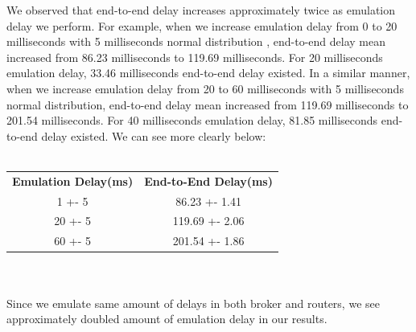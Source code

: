 \documentclass[conference]{IEEEtran}
\begin{document}
We observed that end-to-end delay increases approximately twice as emulation delay we perform. For example, when we increase emulation delay from 0 to  20 milliseconds with 5 milliseconds normal distribution , end-to-end delay mean increased from 86.23 milliseconds to 119.69 milliseconds. For 20 milliseconds emulation delay, 33.46 milliseconds end-to-end delay existed. In a similar manner, when we increase emulation delay from 20 to  60 milliseconds with 5 milliseconds normal distribution, end-to-end delay mean increased from 119.69 milliseconds to 201.54 milliseconds. For 40 milliseconds emulation delay, 81.85 milliseconds end-to-end delay existed. We can see more clearly below:
\\
\\
\begin{tabular}{cc}
\textbf{Emulation Delay(ms)} & \textbf{End-to-End Delay(ms)} \\
1 +- 5                       & 86.23 +- 1.41                      \\
20 +- 5                      & 119.69 +- 2.06                     \\
60 +- 5                      & 201.54 +- 1.86                    
\end{tabular}
\\
\\
Since we emulate same amount of delays in both broker and routers, we see approximately doubled amount of emulation delay in our results.
\end{document}
